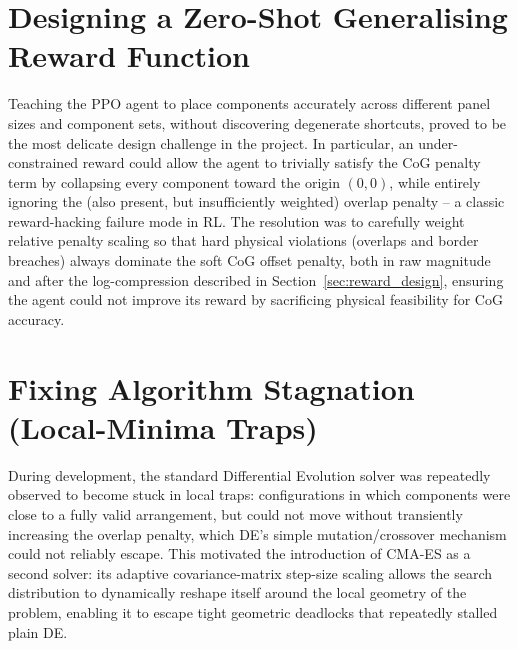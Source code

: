 \documentclass[11pt,a4paper,oneside]{report}
\begin{document}
\section{Designing a Zero-Shot Generalising Reward Function}
Teaching the PPO agent to place components accurately across different panel sizes and component sets, without discovering degenerate shortcuts, proved to be the most delicate design challenge in the project. In particular, an under-constrained reward could allow the agent to trivially satisfy the CoG penalty term by collapsing every component toward the origin $(0,0)$, while entirely ignoring the (also present, but insufficiently weighted) overlap penalty -- a classic reward-hacking failure mode in RL. The resolution was to carefully weight relative penalty scaling so that hard physical violations (overlaps and border breaches) always dominate the soft CoG offset penalty, both in raw magnitude and after the log-compression described in Section~\ref{sec:reward_design}, ensuring the agent could not improve its reward by sacrificing physical feasibility for CoG accuracy.

\section{Fixing Algorithm Stagnation (Local-Minima Traps)}
During development, the standard Differential Evolution solver was repeatedly observed to become stuck in local traps: configurations in which components were close to a fully valid arrangement, but could not move without transiently increasing the overlap penalty, which DE's simple mutation/crossover mechanism could not reliably escape. This motivated the introduction of CMA-ES as a second solver: its adaptive covariance-matrix step-size scaling allows the search distribution to dynamically reshape itself around the local geometry of the problem, enabling it to escape tight geometric deadlocks that repeatedly stalled plain DE.

\end{document}
